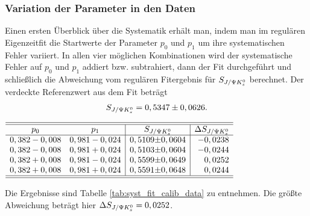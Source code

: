 \subsubsection{Variation der Parameter in den Daten}
Einen ersten Überblick über die Systematik erhält man, indem man
im regulären Eigenzeitfit die Startwerte der Parameter $p_0$ und $p_1$ um ihre systematischen Fehler variiert. In allen vier möglichen Kombinationen wird der systematische Fehler auf $p_0$ und $p_1$ addiert bzw. subtrahiert, dann der Fit durchgeführt und schließlich die Abweichung vom regulären Fitergebnis für $\SJPsi$ berechnet. Der verdeckte Referenzwert aus dem Fit beträgt
\begin{align}
S_{J/\Psi K_s^0} = 0,5347 \pm 0,0626.
\end{align}
\begin{table}[hptb]
\centering
\caption{Variation des Fitergebnisses für $\SJPsi$ bei Veränderung der Startwerte für $p_0$ und $p_1$ $\pm$ ihrer systematischen Unsicherheiten.}
\label{tab:syst_fit_calib_data}
$\begin{array}{cc|r@{\pm}l|r}
\hline\hline
p_0  &  p_1  &  \multicolumn{2}{c|}{\SJPsi}  & \Delta\SJPsi   \\ \hline
0,382 - 0,008  &  0,981 - 0,024  &  0,5109 & 0,0604  &  -0,0238 \\
0,382 - 0,008  &  0,981 + 0,024  &  0,5103 & 0,0604  &  -0,0244 \\
0,382 + 0,008  &  0,981 - 0,024  &  0,5599 & 0,0649  &   0,0252 \\
0,382 + 0,008  &  0,981 + 0,024  &  0,5591 & 0,0648  &   0,0244 \\
\hline\hline
\end{array}$
\end{table}
Die Ergebnisse sind Tabelle \ref{tab:syst_fit_calib_data} zu entnehmen. Die größte Abweichung beträgt hier $\Delta S_{J/\Psi K_s^0} = 0,0252$.

